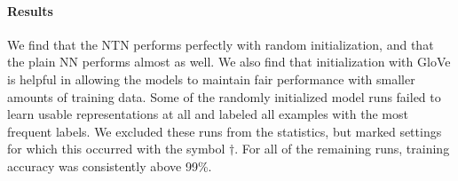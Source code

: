 \paragraph{Results} 
We find that the NTN performs perfectly with random initialization, and that the plain NN performs almost as well. We also find that initialization with GloVe is helpful in allowing the models to maintain fair performance
with smaller amounts of training data. Some of the randomly initialized model runs failed to learn
usable representations at all and labeled all examples with the most frequent labels. We excluded these runs from the statistics, but marked settings for which this occurred with the symbol $\dagger$. For all of the remaining runs, training accuracy was consistently above 99\%.

\begin{table}[h]
\centering{}
 \caption{Mean test \% accuracy scores (with standard error) on the WordNet data over five-fold crossvalidation. The baseline figure is simply the frequency of the most frequent class, .\label{b-table}} 
\end{table}

